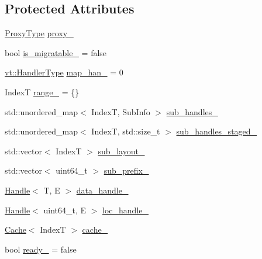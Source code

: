 \subsection*{Protected Attributes}
\begin{DoxyCompactItemize}
\item 
\hyperlink{structvt_1_1rdma_1_1_sub_handle_a758bee2e499658cfef92ace83eea6590}{Proxy\+Type} \hyperlink{structvt_1_1rdma_1_1_sub_handle_a10a5a6554a57910351679c93432af59e}{proxy\+\_\+}
\item 
bool \hyperlink{structvt_1_1rdma_1_1_sub_handle_a2e2fe2ff0da95f9b228d4f0d3cf5b3ce}{is\+\_\+migratable\+\_\+} = false
\item 
\hyperlink{namespacevt_af64846b57dfcaf104da3ef6967917573}{vt\+::\+Handler\+Type} \hyperlink{structvt_1_1rdma_1_1_sub_handle_a5ecf30f3c569bbfe574df42843cf0059}{map\+\_\+han\+\_\+} = 0
\item 
IndexT \hyperlink{structvt_1_1rdma_1_1_sub_handle_a7545e2edae28878b31bfc7bccadc0171}{range\+\_\+} = \{\}
\item 
std\+::unordered\+\_\+map$<$ IndexT, Sub\+Info $>$ \hyperlink{structvt_1_1rdma_1_1_sub_handle_ae5300cda983bbb530edff53b377a71a8}{sub\+\_\+handles\+\_\+}
\item 
std\+::unordered\+\_\+map$<$ IndexT, std\+::size\+\_\+t $>$ \hyperlink{structvt_1_1rdma_1_1_sub_handle_a5643ad6c60d3cf3478bc9d16dfe72489}{sub\+\_\+handles\+\_\+staged\+\_\+}
\item 
std\+::vector$<$ IndexT $>$ \hyperlink{structvt_1_1rdma_1_1_sub_handle_aefa1426200c59256792c6e048d28d162}{sub\+\_\+layout\+\_\+}
\item 
std\+::vector$<$ uint64\+\_\+t $>$ \hyperlink{structvt_1_1rdma_1_1_sub_handle_a964f4cb2857f1d970253f89ad5bb708c}{sub\+\_\+prefix\+\_\+}
\item 
\hyperlink{structvt_1_1rdma_1_1_handle}{Handle}$<$ T, E $>$ \hyperlink{structvt_1_1rdma_1_1_sub_handle_a9d6fa87336ed3a1f7e3167f1e44c07b2}{data\+\_\+handle\+\_\+}
\item 
\hyperlink{structvt_1_1rdma_1_1_handle}{Handle}$<$ uint64\+\_\+t, E $>$ \hyperlink{structvt_1_1rdma_1_1_sub_handle_a2283d4e38954f446ae4a76ccfae5f19b}{loc\+\_\+handle\+\_\+}
\item 
\hyperlink{structvt_1_1rdma_1_1_cache}{Cache}$<$ IndexT $>$ \hyperlink{structvt_1_1rdma_1_1_sub_handle_aa4d5fc9bb2240a72af8af9164e1d8bf3}{cache\+\_\+}
\item 
bool \hyperlink{structvt_1_1rdma_1_1_sub_handle_a17f367f36559b48d0f18ec869e4ded8c}{ready\+\_\+} = false
\item 

\end{DoxyCompactItemize}
